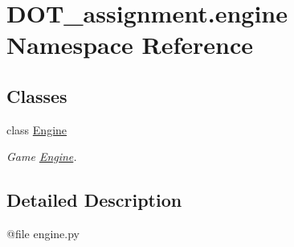 \hypertarget{namespace_d_o_t__assignment_1_1engine}{}\section{D\+O\+T\+\_\+assignment.\+engine Namespace Reference}
\label{namespace_d_o_t__assignment_1_1engine}
\subsection*{Classes}
\begin{DoxyCompactItemize}
\item 
class \mbox{\hyperlink{class_d_o_t__assignment_1_1engine_1_1_engine}{Engine}}
\begin{DoxyCompactList}\small\item\em Game \mbox{\hyperlink{class_d_o_t__assignment_1_1engine_1_1_engine}{Engine}}. \end{DoxyCompactList}\end{DoxyCompactItemize}


\subsection{Detailed Description}
\begin{DoxyVerb}@file engine.py
\end{DoxyVerb}
 
